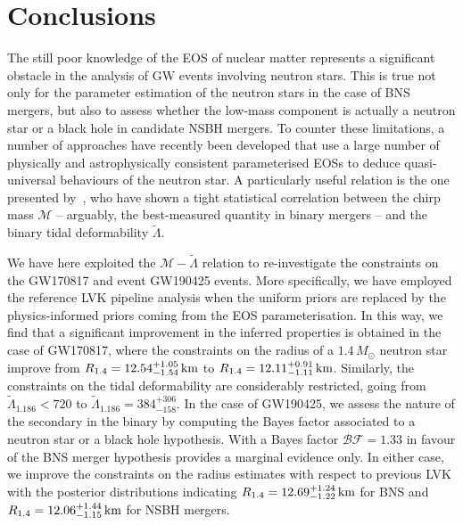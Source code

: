 \documentclass[twocolumn]{aastex631}
\begin{document}
\section{Conclusions}


The still poor knowledge of the EOS of nuclear matter represents a
significant obstacle in the analysis of GW events involving neutron
stars. This is true not only for the parameter estimation of the
neutron stars in the case of BNS mergers, but also to assess whether the
low-mass component is actually a neutron star or a black hole in
candidate NSBH mergers. To counter these limitations, a number of
approaches have recently been developed that use a large number of
physically and astrophysically consistent parameterised EOSs to deduce
quasi-universal behaviours of the neutron star. A particularly useful
relation is the one presented by~\cite{Altiparmak:2022}, who have shown a
tight statistical correlation between the chirp mass $\mathcal{M}$ --
arguably, the best-measured quantity in binary mergers -- and the binary
tidal deformability $\tilde{\Lambda}$.

We have here exploited the $\mathcal{M}\!- \!\tilde{\Lambda}$ relation to
re-investigate the constraints on the GW170817 and event GW190425
events. More specifically, we have employed the reference LVK pipeline
analysis when the uniform priors are replaced by the physics-informed
priors coming from the EOS parameterisation. In this way, we find that a
significant improvement in the inferred properties is obtained in the
case of GW170817, where the constraints on the radius of a $1.4 \,
M_\odot$ neutron star improve from $R_{1.4} = {12.54^{+1.05}_{-1.54}} \,
{\rm km}$ to $R_{1.4} = 12.11^{+0.91}_{-1.11} \, {\rm km}$.
Similarly, the constraints on the tidal
deformability are considerably restricted, going from
$\tilde{\Lambda}_{1.186} < 720$ to $\tilde{\Lambda}_{1.186} =
384^{+306}_{-158}$. In the case of GW190425, we assess the nature of the
secondary in the binary by computing the Bayes factor associated to a
neutron star or a black hole hypothesis. With a Bayes factor
$\mathcal{BF}=1.33$ in favour of the BNS merger hypothesis provides a
marginal evidence only. In either case, we improve the constraints on the
radius estimates with respect to previous LVK with the posterior
distributions indicating $R_{1.4} = 12.69^{+1.24}_{-1.22} \, {\rm km}$
for BNS and $R_{1.4} = 12.06^{+1.44}_{-1.15} \, {\rm km}$ for NSBH
mergers.
\end{document}
